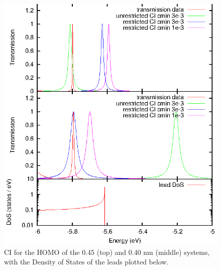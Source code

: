\begin{figure}
	\begin{center}
		\includegraphics[width=0.9\linewidth]{figures/cihomo.eps}
	\end{center}
	\caption{CI for the \ac{HOMO} of the 0.45 (top) and 0.40 nm (middle)
                 systems, with the Density of States of the leads plotted
                 below.}
	\label{fig:cihomo}
\end{figure}


